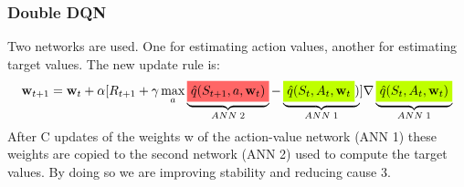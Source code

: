 \subsubsection{Double DQN}
Two networks are used. One for estimating action values, another for estimating target values.
The new update rule is:
\begin{align}
    \mathbf{w}_{t+1}=\mathbf{w}_t+\alpha[R_{t+1}+\gamma\max_a\underbrace{\colorbox{red!60!white}{$\hat{q}(S_{t+1}, a, \mathbf{w}_t)$}}_{ANN\;2}-\underbrace{\colorbox{lime}{$\hat{q}(S_t, A_t, \mathbf{w}_t$})}_{ANN\;1}]\nabla \underbrace{\colorbox{lime}{$\hat{q}(S_t, A_t, \mathbf{w}_t)$}}_{ANN\;1}
\end{align}
After C updates of the weights w of the action-value network (ANN 1) these weights are copied to the second network (ANN 2) used to compute the target values. By doing so we are improving stability and reducing cause 3.